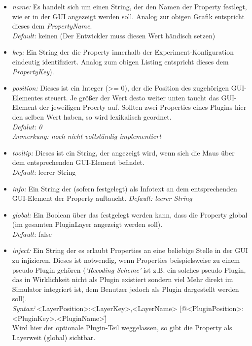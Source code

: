 \documentclass[a4paper, 11pt]{article} %
\begin{document}
\begin{itemize}
	\item \emph{name:} Es handelt sich um einen String, der den Namen der Property festlegt, wie er in der GUI angezeigt werden soll. Analog zur obigen Grafik entspricht dieses dem \emph{PropertyName}.\\
	\emph{Default:} keinen (Der Entwickler muss diesen Wert händisch setzen)
	\item \emph{key:} Ein String der die Property innerhalb der Experiment-Konfiguration eindeutig identifiziert. Analog zum obigen Listing entspricht dieses dem \emph{PropertyKey}).
	\item \emph{position:} Dieses ist ein Integer (>= 0), der die Position des zugehörigen GUI-Elementes steuert. Je größer der Wert desto weiter unten taucht das GUI-Element der jeweiligen Proerty auf. Sollten zwei Properties eines Plugins hier den selben Wert haben, so wird lexikalisch geordnet.\\
	\emph{Defalut: 0}\\
	\emph{Anmerkung: noch nicht vollständig implementiert}
	\item \emph{tooltip:} Dieses ist ein String, der angezeigt wird, wenn sich die Maus über dem entsprechenden GUI-Element befindet.\\
	\emph{Default:} leerer String 
	\item \emph{info:} Ein String der (sofern festgelegt) als Infotext an dem entsprechenden GUI-Element der Property auftaucht.  
	\emph{Default: leerer String}
	\item \emph{global:} Ein Boolean über das festgelegt werden kann, dass die Property global (im gesamten PluginLayer angezeigt werden soll).\\
	\emph{Default:} false
	\item \emph{inject:} Ein String der es erlaubt Properties an eine beliebige Stelle in der GUI zu injizieren. Dieses ist notwendig, wenn Properties beispielsweise zu einem pseudo Plugin gehören (\emph{'Recoding Scheme'} ist z.B. ein solches pseudo Plugin, das in Wirklichkeit nicht als Plugin existiert sondern viel Mehr direkt im Simulator integriert ist, dem Benutzer jedoch als Plugin dargestellt werden soll). \\
	\emph{Syntax:} \"{}<LayerPosition>:<LayerKey>,<LayerName> [@<PluginPosition>:<PluginKey>,<PluginName>]\"{}\\
	Wird hier der optionale Plugin-Teil weggelassen, so gibt die Property als Layerweit (global) sichtbar.\\

\end{itemize}
\end{document}
